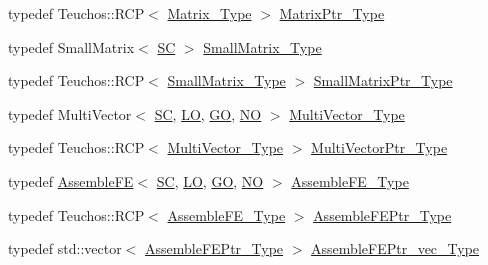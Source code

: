 \begin{DoxyCompactItemize}
\item 
typedef Teuchos\+::\+R\+CP$<$ \hyperlink{classFEDD_1_1FE__Test_ab21a3d554ec8bf6763a7dabcbe800b35}{Matrix\+\_\+\+Type} $>$ \hyperlink{classFEDD_1_1FE__Test_a3c2e34afc3a1495c2b00313399f12b3d}{Matrix\+Ptr\+\_\+\+Type}
\item 
typedef Small\+Matrix$<$ \hyperlink{fe__test__laplace_8cpp_a79c7e86a57edbb2a5a53242bcd04e41e}{SC} $>$ \hyperlink{classFEDD_1_1FE__Test_a11f3375e690a493e9076b63b0f86edf4}{Small\+Matrix\+\_\+\+Type}
\item 
typedef Teuchos\+::\+R\+CP$<$ \hyperlink{classFEDD_1_1FE__Test_a11f3375e690a493e9076b63b0f86edf4}{Small\+Matrix\+\_\+\+Type} $>$ \hyperlink{classFEDD_1_1FE__Test_a675b52d9e58407c6baadb403394be92b}{Small\+Matrix\+Ptr\+\_\+\+Type}
\item 
typedef Multi\+Vector$<$ \hyperlink{fe__test__laplace_8cpp_a79c7e86a57edbb2a5a53242bcd04e41e}{SC}, \hyperlink{fe__test__laplace_8cpp_ad6a38c9f07d3fd633eefca5bccad8410}{LO}, \hyperlink{fe__test__laplace_8cpp_afa2946b509009b4f45eb04bd8c5b27d9}{GO}, \hyperlink{fe__test__laplace_8cpp_a5e24f37b28787429872b6ecb1d0417ce}{NO} $>$ \hyperlink{classFEDD_1_1FE__Test_a431ec5a97628feb8a0a8d16874ecd060}{Multi\+Vector\+\_\+\+Type}
\item 
typedef Teuchos\+::\+R\+CP$<$ \hyperlink{classFEDD_1_1FE__Test_a431ec5a97628feb8a0a8d16874ecd060}{Multi\+Vector\+\_\+\+Type} $>$ \hyperlink{classFEDD_1_1FE__Test_ac7c0363aa74e0bfcb903c13330c50185}{Multi\+Vector\+Ptr\+\_\+\+Type}
\item 
typedef \hyperlink{classFEDD_1_1AssembleFE}{Assemble\+FE}$<$ \hyperlink{fe__test__laplace_8cpp_a79c7e86a57edbb2a5a53242bcd04e41e}{SC}, \hyperlink{fe__test__laplace_8cpp_ad6a38c9f07d3fd633eefca5bccad8410}{LO}, \hyperlink{fe__test__laplace_8cpp_afa2946b509009b4f45eb04bd8c5b27d9}{GO}, \hyperlink{fe__test__laplace_8cpp_a5e24f37b28787429872b6ecb1d0417ce}{NO} $>$ \hyperlink{classFEDD_1_1FE__Test_afbc20c921480ce9f89ec045f94f6806a}{Assemble\+F\+E\+\_\+\+Type}
\item 
typedef Teuchos\+::\+R\+CP$<$ \hyperlink{classFEDD_1_1FE__Test_afbc20c921480ce9f89ec045f94f6806a}{Assemble\+F\+E\+\_\+\+Type} $>$ \hyperlink{classFEDD_1_1FE__Test_a7a938cd88b5f936c58993fff97074e2d}{Assemble\+F\+E\+Ptr\+\_\+\+Type}
\item 
typedef std\+::vector$<$ \hyperlink{classFEDD_1_1FE__Test_a7a938cd88b5f936c58993fff97074e2d}{Assemble\+F\+E\+Ptr\+\_\+\+Type} $>$ \hyperlink{classFEDD_1_1FE__Test_a7c6207bb2e578ea92dbfb20aa766e2d3}{Assemble\+F\+E\+Ptr\+\_\+vec\+\_\+\+Type}
\item 

\end{DoxyCompactItemize}
